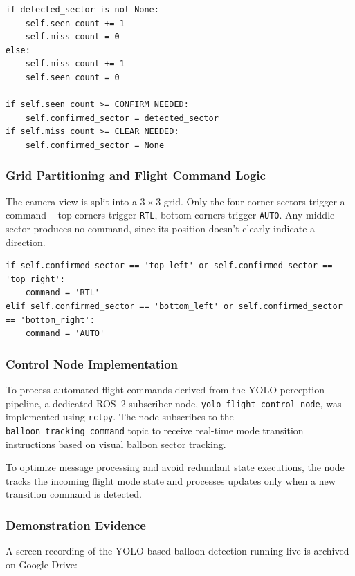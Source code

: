 \documentclass[12pt,a4paper]{article}
\begin{document}
\begin{lstlisting}[style=pythonstyle, caption={Same debounce pattern as the main pipeline, applied to grid sectors.}]
if detected_sector is not None:
    self.seen_count += 1
    self.miss_count = 0
else:
    self.miss_count += 1
    self.seen_count = 0

if self.seen_count >= CONFIRM_NEEDED:
    self.confirmed_sector = detected_sector
if self.miss_count >= CLEAR_NEEDED:
    self.confirmed_sector = None
\end{lstlisting}

\subsubsection{Grid Partitioning and Flight Command Logic}
The camera view is split into a $3 \times 3$ grid. Only the four corner
sectors trigger a command -- top corners trigger \texttt{RTL}, bottom
corners trigger \texttt{AUTO}. Any middle sector produces no command,
since its position doesn't clearly indicate a direction.

\begin{lstlisting}[style=pythonstyle, caption={Triggering flight modes based on grid corner sectors.}]
if self.confirmed_sector == 'top_left' or self.confirmed_sector == 'top_right':
    command = 'RTL'
elif self.confirmed_sector == 'bottom_left' or self.confirmed_sector == 'bottom_right':
    command = 'AUTO'
\end{lstlisting}

\subsubsection{Control Node Implementation}
To process automated flight commands derived from the YOLO perception pipeline, a dedicated ROS~2 subscriber node, \texttt{yolo\_flight\_control\_node}, was implemented using \texttt{rclpy}. The node subscribes to the \texttt{balloon\_tracking\_command} topic to receive real-time mode transition instructions based on visual balloon sector tracking.

To optimize message processing and avoid redundant state executions, the node tracks the incoming flight mode state and processes updates only when a new transition command is detected.



\subsubsection{Demonstration Evidence}
A screen recording of the YOLO-based balloon detection running live is
archived on Google Drive:
\end{document}
